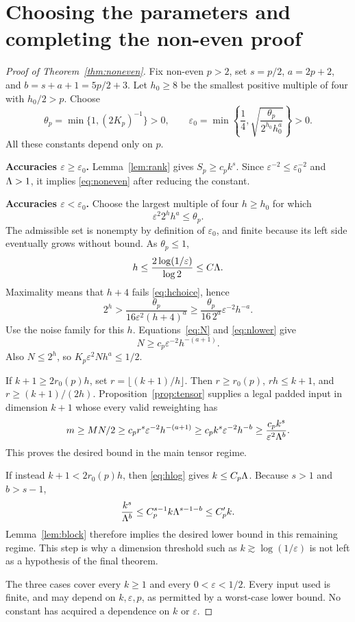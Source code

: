 \documentclass[11pt]{article}
\theoremstyle{remark}\newtheorem{remark}[theorem]{Remark}
\newcommand{\eps}{\varepsilon}\newcommand{\norm}[1]{\left\|#1\right\|}
\begin{document}
\section{Choosing the parameters and completing the non-even proof}\label{sec:parameters}
\begin{proof}[Proof of Theorem~\ref{thm:noneven}]
Fix non-even $p>2$, set $s=p/2$, $a=2p+2$, and $b=s+a+1=5p/2+3$. Let $h_0\ge8$ be the smallest positive multiple of four with $h_0/2>p$. Choose
\[
 \theta_p=\min\{1,(2K_p)^{-1}\}>0,
 \qquad
 \eps_0=\min\left\{\frac14,\sqrt{\frac{\theta_p}{2^{h_0}h_0^a}}\right\}>0.
\]
All these constants depend only on $p$.

\textbf{Accuracies $\eps\ge\eps_0$.}
Lemma~\ref{lem:rank} gives $S_p\ge c_pk^s$. Since $\eps^{-2}\le\eps_0^{-2}$ and $\Lambda>1$, it implies \eqref{eq:noneven} after reducing the constant.

\textbf{Accuracies $\eps<\eps_0$.}
Choose the largest multiple of four $h\ge h_0$ for which
\begin{equation}\label{eq:hchoice}
 \eps^2 2^h h^a\le\theta_p.
\end{equation}
The admissible set is nonempty by definition of $\eps_0$, and finite because its left side eventually grows without bound. As $\theta_p\le1$,
\begin{equation}\label{eq:hlog}
 h\le\frac{2\log(1/\eps)}{\log2}\le C\Lam.
\end{equation}
Maximality means that $h+4$ fails \eqref{eq:hchoice}, hence
\begin{equation}\label{eq:nlower}
 2^h>\frac{\theta_p}{16\eps^2(h+4)^a}
 \ge\frac{\theta_p}{16\,2^a}\eps^{-2}h^{-a}.
\end{equation}
Use the noise family for this $h$. Equations~\eqref{eq:N} and \eqref{eq:nlower} give
\begin{equation}\label{eq:Nlower}
 N\ge c_p\eps^{-2}h^{-(a+1)}.
\end{equation}
Also $N\le2^h$, so $K_p\eps^2Nh^a\le1/2$.

If $k+1\ge2r_0(p)h$, set $r=\lfloor(k+1)/h\rfloor$. Then $r\ge r_0(p)$, $rh\le k+1$, and $r\ge(k+1)/(2h)$. Proposition~\ref{prop:tensor} supplies a legal padded input in dimension $k+1$ whose every valid reweighting has
\[
 m\ge MN/2\ge c_pr^s\eps^{-2}h^{-(a+1)}
 \ge c_pk^s\eps^{-2}h^{-b}
 \ge\frac{c_pk^s}{\eps^2\Lam^b}.
\]
This proves the desired bound in the main tensor regime.

If instead $k+1<2r_0(p)h$, then \eqref{eq:hlog} gives $k\le C_p\Lambda$. Because $s>1$ and $b>s-1$,
\[
 \frac{k^s}{\Lambda^b}\le C_p^{s-1}k\Lambda^{s-1-b}\le C'_p k.
\]
Lemma~\ref{lem:block} therefore implies the desired lower bound in this remaining regime. This step is why a dimension threshold such as $k\gtrsim\log(1/\eps)$ is not left as a hypothesis of the final theorem.

The three cases cover every $k\ge1$ and every $0<\eps<1/2$. Every input used is finite, and may depend on $k,\eps,p$, as permitted by a worst-case lower bound. No constant has acquired a dependence on $k$ or $\eps$.
\end{proof}
\end{document}
